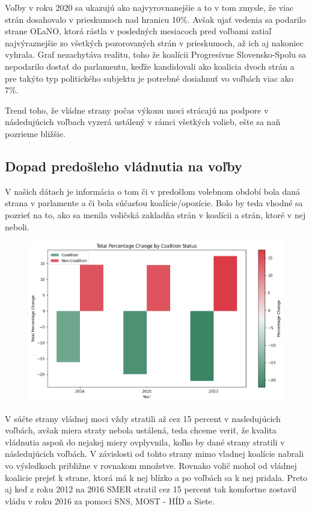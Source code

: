 \documentclass[main.tex]{subfiles}
\begin{document}
Voľby v roku 2020 sa ukazujú ako najvyrovnanejšie a to v tom zmysle, že viac strán dosahovalo v prieskumoch nad hranicu 10\%. Avšak ujať vedenia sa podarilo strane OĽaNO, ktorá rástla v posledných mesiacoch pred voľbami zatiaľ najvýraznejšie zo všetkých pozorovaných strán v prieskumoch, až ich aj nakoniec vyhrala. Graf nezachytáva realitu, toho že koalícii Progresívne Slovensko-Spolu sa nepodarilo dostať do parlamentu, keďže kandidovali ako koalicia dvoch strán a pre takýto typ politického subjektu je potrebné dosiahnuť vo voľbách viac ako 7\%. 

Trend toho, že vládne strany počas výkonu moci strácajú na podpore v následujúcich voľbach vyzerá ustálený v rámci všetkých volieb, ešte sa naň pozrieme bližšie. 

\subsection{Dopad predošleho vládnutia na voľby}

V našich dátach je informácia o tom či v predošlom volebnom období bola daná strana v parlamente a či bola súčasťou koalície/opozície. Bolo by teda vhodné sa pozrieť na to, ako sa menila voličská zakladňa strán v koalícii a strán, ktoré v nej neboli. 

\begin{figure}[!htbp]
    \centering
    \includegraphics[width=\textwidth]{images_exploratory/Coalition_vs_NoCoalition.png}
    \caption{}
\end{figure}

V súčte strany vládnej moci vždy stratili až cez 15 percent v nasledujúcich voľbách, avšak miera straty nebola ustálená, teda chceme veriť, že kvalita vládnutia aspoň do nejakej miery ovplyvnila, koľko by dané strany stratili v následujúcich voľbách. V závislosti od tohto strany mimo vladnej koalície nabrali vo výsledkoch približne v rovnakom množstve. Rovnako volič mohol od vládnej koalicie prejsť k strane, ktorá má k nej blízko a po voľbách sa k nej pridala. Preto aj keď z roku 2012 na 2016 SMER stratil cez 15 percent tak komfortne zostavil vládu v roku 2016 za pomoci SNS, MOST - HÍD a Siete.
\end{document}
